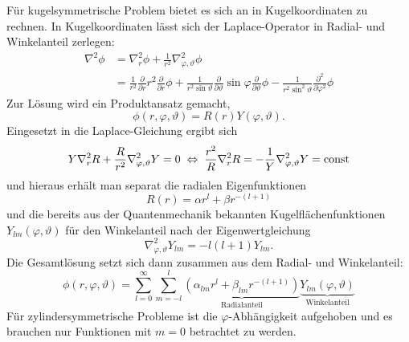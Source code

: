 Für kugelsymmetrische Problem bietet es sich an in Kugelkoordinaten zu rechnen. In Kugelkoordinaten lässt sich der Laplace-Operator in Radial- und Winkelanteil zerlegen:
\begin{align*}
	\nabla ^{2}\phi &=\nabla _{r}^{2}\phi +\frac{1}{r^{2}}\nabla _{\varphi ,\vartheta }^{2}\phi \\&=\frac{1}{r^{2}}\frac{\partial }{\partial r}r^{2}\frac{\partial }{\partial r}\phi +\frac{1}{r^{2}\sin \vartheta }\frac{\partial }{\partial \vartheta }\sin \varphi \frac{\partial }{\partial \vartheta }\phi -\frac{1}{r^{2}\sin ^{2} \vartheta }\frac{\partial ^{2}}{\partial \varphi ^{2}}\phi
\end{align*}
Zur Lösung wird ein Produktansatz gemacht,
\begin{equation*}
	\phi \left(r,\varphi ,\vartheta \right)=R\left(r\right)Y\left(\varphi ,\vartheta \right).
\end{equation*}
Eingesetzt in die Laplace-Gleichung ergibt sich
\begin{equation*}
	Y\nabla _{r}^{2}R+\frac{R}{r^{2}}\nabla _{\varphi ,\vartheta }^{2}Y=0 \;\Leftrightarrow\;\frac{r^{2}}{R}\nabla _{r}^{2}R=-\frac{1}{Y}\nabla _{\varphi ,\vartheta }^{2}Y=\text{const}
\end{equation*}
und hieraus erhält man separat die radialen Eigenfunktionen
\begin{equation*}
	R\left(r\right)=\alpha r^{l}+\beta r^{-\left(l+1\right)}
\end{equation*}
und die bereits aus der Quantenmechanik bekannten Kugelflächenfunktionen $Y_{lm}\left(\varphi ,\vartheta \right)$ für den Winkelanteil nach der Eigenwertgleichung
\begin{equation*}
	\nabla _{\varphi ,\vartheta }^{2}Y_{lm}=-l\left(l+1\right)Y_{lm}.
\end{equation*}
Die Gesamtlösung setzt sich dann zusammen aus dem Radial- und Winkelanteil:
\begin{equation*}
	\phi \left(r,\varphi ,\vartheta \right)=\sum _{l=0}^{\infty }\sum _{m=-l}^{l}\underset{\text{Radialanteil}}{\underbrace{\left(\alpha _{lm}r^{l}+\beta _{lm}r^{-\left(l+1\right)}\right)}}\underset{\text{Winkelanteil}}{\underbrace{Y_{lm}\left(\varphi ,\vartheta \right)}}
\end{equation*}
Für zylindersymmetrische Probleme ist die $\varphi $-Abhängigkeit aufgehoben und es brauchen nur Funktionen mit $m=0$ betrachtet zu werden.

